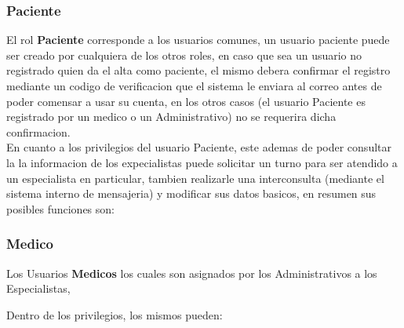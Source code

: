 \subsubsection{Paciente}

El rol \textbf{Paciente} corresponde a los usuarios comunes, un usuario paciente puede 
ser creado por cualquiera de los otros roles, en caso que sea un usuario no registrado
quien da el alta como paciente, el mismo debera confirmar el registro mediante un
codigo de verificacion que el sistema le enviara al correo antes de poder comensar
a usar su cuenta, en los otros casos (el usuario Paciente es registrado por un 
medico o un Administrativo) no se requerira dicha confirmacion.\\[0.1cm]

En cuanto a los privilegios del usuario Paciente, este ademas de poder consultar la 
la informacion de los expecialistas puede solicitar un turno para ser atendido 
a un especialista en particular, tambien realizarle una interconsulta (mediante
el sistema interno de mensajeria) y modificar sus datos basicos, en resumen sus 
posibles funciones son:


\subsubsection{Medico}

Los Usuarios \textbf{Medicos} los cuales son asignados por los Administrativos a 
los Especialistas, 

Dentro de los privilegios, los mismos pueden:

